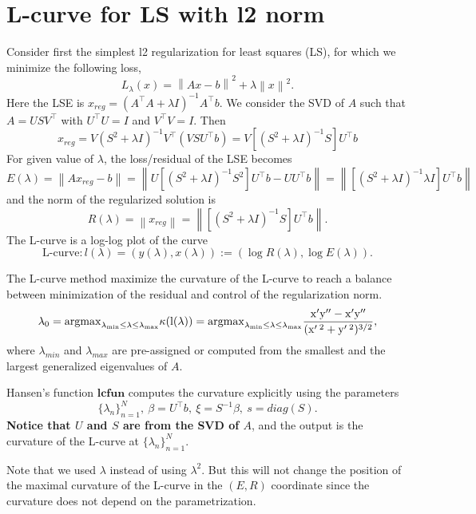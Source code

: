 \documentclass{article} %
\theoremstyle{plain}
\numberwithin{equation}{section}
\newcommand{\norm}[1]{\left\|#1\right\|}
\begin{document}
\section{L-curve for LS with l2 norm}
Consider first the simplest l2 regularization for least squares (LS), for which we minimize the following loss,
$$
L_\lambda(x) = \norm{Ax - b}^2 + \lambda \norm{x}^2.
$$
Here the LSE is $x_{reg} = (A^\top A+\lambda I)^{-1}A^\top b$. We consider the SVD of $A$ such that $A=USV^\top$ with $U^\top U =I $ and $V^\top V= I$. Then 
$$x_{reg} = V(S^2 + \lambda I)^{-1}V^\top\left( VSU^\top b\right)
= V\left[(S^2 + \lambda I)^{-1}S\right]U^\top b
$$
For given value of $\lambda$, the loss/residual of the LSE becomes
$$E(\lambda) = \norm{Ax_{reg} - b} = \norm{U\left[(S^2 + \lambda I)^{-1}S^2\right]U^\top b - UU^\top b} = \norm{\left[(S^2 + \lambda I)^{-1}\lambda I\right]U^\top b}$$
and the norm of the regularized solution is 
$$
R(\lambda) = \norm{x_{reg}} = \norm{\left[(S^2 + \lambda I)^{-1}S\right]U^\top b}.
$$
The L-curve is a log-log plot of the curve 
\[
\text{L-curve}: l(\lambda)=(y(\lambda),x(\lambda)) := (\log R(\lambda), \log E(\lambda)). 
\]

The L-curve method maximize the curvature of the L-curve to reach a balance between minimization of the residual and control of the regularization norm. 
$$ %
	\lambda_{0} 
	= \rm{argmax}_{\lambda_{\text{min}} \leq \lambda \leq \lambda_{\text{max}}}\kappa(l (\lambda)) 
	= \rm{argmax}_{\lambda_{\text{min}} \leq \lambda \leq \lambda_{\text{max}}}
	\frac{x'y'' - x' y''}{(x'\,^2 + y'\,^2)^{3/2}},
$$ %
where $\lambda_{min}$ and $\lambda_{max}$ are pre-assigned or computed from the smallest and the largest generalized eigenvalues of $A$.  

Hansen's function $\textbf{lcfun}$ computes the curvature explicitly using the parameters 
\begin{equation}\label{eq:para_lcfun}
\{\lambda_n\}_{n = 1}^N, \ \beta = U^\top b, \ \xi = S^{-1}\beta, \ s = diag(S).
\end{equation}
\textbf{Notice that $U$ and $S$ are from the SVD of $A$}, and the output is the curvature of the L-curve at $\{\lambda_n\}_{n = 1}^N.$

Note that we used $\lambda$ instead of using $\lambda^2$. But this will not change the position of the maximal curvature of the L-curve in the $(E, R)$ coordinate since the curvature does not depend on the parametrization.  
\end{document}
